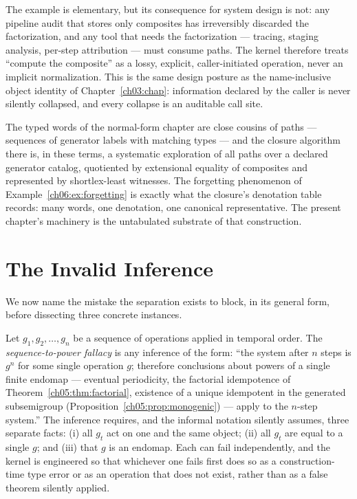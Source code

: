 The example is elementary, but its consequence for system design is not:
any pipeline audit that stores only composites has irreversibly discarded
the factorization, and any tool that needs the factorization --- tracing,
staging analysis, per-step attribution --- must consume paths. The kernel
therefore treats ``compute the composite'' as a lossy, explicit,
caller-initiated operation, never an implicit normalization. This is the
same design posture as the name-inclusive object identity of
Chapter~\ref{ch03:chap}: information declared by the caller is never
silently collapsed, and every collapse is an auditable call site.

\begin{remark}
\label{ch06:rem:nfpreview}
The typed words of the normal-form chapter are close cousins of paths ---
sequences of generator labels with matching types --- and the closure
algorithm there is, in these terms, a systematic exploration of all paths
over a declared generator catalog, quotiented by extensional equality of
composites and represented by shortlex-least witnesses. The forgetting
phenomenon of Example~\ref{ch06:ex:forgetting} is exactly what the
closure's denotation table records: many words, one denotation, one
canonical representative. The present chapter's machinery is the
untabulated substrate of that construction.
\end{remark}

\section{The Invalid Inference}
\label{ch06:sec:invalid}

We now name the mistake the separation exists to block, in its general
form, before dissecting three concrete instances.

\begin{finding}
\label{ch06:find:fallacy}
Let $g_1, g_2, \dots, g_n$ be a sequence of operations applied in temporal
order. The \emph{sequence-to-power fallacy} is any inference of the form:
``the system after $n$ steps is $g^{n}$ for some single operation $g$;
therefore conclusions about powers of a single finite endomap ---
eventual periodicity, the factorial idempotence of
Theorem~\ref{ch05:thm:factorial}, existence of a unique idempotent in the
generated subsemigroup (Proposition~\ref{ch05:prop:monogenic}) --- apply
to the $n$-step system.'' The inference requires, and the informal
notation silently assumes, three separate facts: (i) all $g_t$ act on one
and the same object; (ii) all $g_t$ are equal to a single $g$; and
(iii) that $g$ is an endomap. Each can fail independently, and the kernel
is engineered so that whichever one fails first does so as a construction-
time type error or as an operation that does not exist, rather than as a
false theorem silently applied.
\end{finding}

